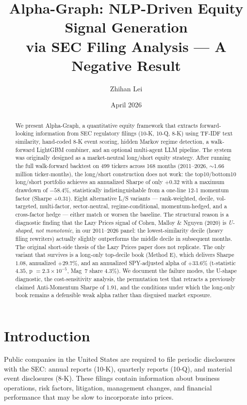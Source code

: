 \documentclass[11pt,a4paper]{article}
\title{Alpha-Graph: NLP-Driven Equity Signal Generation\\via SEC Filing Analysis --- A Negative Result}
\author{Zhihan Lei}
\date{April 2026}
\begin{document}
\maketitle

\begin{abstract}
We present Alpha-Graph, a quantitative equity framework that extracts forward-looking information from SEC regulatory filings (10-K, 10-Q, 8-K) using TF-IDF text similarity, hand-coded 8-K event scoring, hidden Markov regime detection, a walk-forward LightGBM combiner, and an optional multi-agent LLM pipeline. The system was originally designed as a market-neutral long/short equity strategy. After running the full walk-forward backtest on 499 tickers across 168 months (2011--2026, $\sim$1.66 million ticker-months), the long/short construction does not work: the top10/bottom10 long/short portfolio achieves an annualized Sharpe of only $+0.32$ with a maximum drawdown of $-58.4\%$, statistically indistinguishable from a one-line 12-1 momentum factor (Sharpe $+0.31$). Eight alternative L/S variants --- rank-weighted, decile, vol-targeted, multi-factor, sector-neutral, regime-conditional, momentum-hedged, and a cross-factor hedge --- either match or worsen the baseline. The structural reason is a diagnostic finding that the Lazy Prices signal of Cohen, Malloy \& Nguyen (2020) is \emph{U-shaped, not monotonic}, in our 2011--2026 panel: the lowest-similarity decile (heavy filing rewriters) actually slightly outperforms the middle decile in subsequent months. The original short-side thesis of the Lazy Prices paper does not replicate. The only variant that survives is a long-only top-decile book (Method E), which delivers Sharpe $1.08$, annualized $+29.7\%$, and an annualized SPY-adjusted alpha of $+33.6\%$ (t-statistic $4.35$, p $= 2.3 \times 10^{-5}$, Mag~7 share $4.3\%$). We document the failure modes, the U-shape diagnostic, the cost-sensitivity analysis, the permutation test that retracts a previously claimed Anti-Momentum Sharpe of 1.91, and the conditions under which the long-only book remains a defensible weak alpha rather than disguised market exposure.
\end{abstract}

\section{Introduction}

Public companies in the United States are required to file periodic disclosures with the SEC: annual reports (10-K), quarterly reports (10-Q), and material event disclosures (8-K). These filings contain information about business operations, risk factors, litigation, management changes, and financial performance that may be slow to incorporate into prices.
\end{document}
